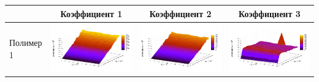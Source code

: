 \documentclass[12pt,a4paper]{article}
\begin{document}
\begin{table}[h]
  \centering
  \footnotesize
  \begin{tabular}{l | c c c}
	  & Коэффициент 1 & Коэффициент 2 & Коэффициент 3 \\ \hline
	\begin{rotate}{90}Полимер 1\end{rotate} &	\includegraphics[scale=0.4]{figs/all/p1.txt_coeff0.dat.pdf} & \includegraphics[scale=0.4]{figs/all/p1.txt_coeff1.dat.pdf} & \includegraphics[scale=0.4]{figs/all/p1.txt_coeff2.dat.pdf} \\

\end{tabular}
\end{table}
\end{document}
